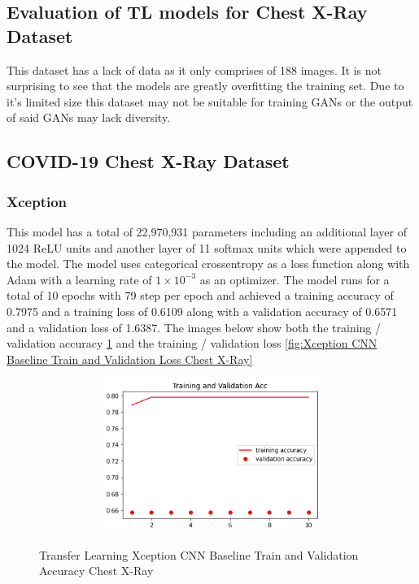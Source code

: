 \subsection{Evaluation of TL models for Chest X-Ray Dataset}
This dataset has a lack of data as it only comprises of 188 images.  It is not surprising to see that the models are greatly overfitting the training set.  Due to it's limited size this dataset may not be suitable for training GANs or the output of said GANs may lack diversity.
\subsection{COVID-19 Chest X-Ray Dataset}
\subsubsection{Xception}
This model has a total of 22,970,931 parameters including an additional layer of 1024 ReLU units and another layer of 11 softmax units which were appended to the model.  The model uses categorical crossentropy as a loss function along with Adam with a learning rate of $1 \times 10^{-3}$ as an optimizer.  The model runs for a total of 10 epochs with 79 step per epoch and achieved a training accuracy of 0.7975 and a training loss of 0.6109 along with a validation accuracy of 0.6571 and a validation loss of 1.6387. The images below show both the training / validation accuracy \ref{fig:Xception CNN Baseline Train and Validation Accuracy Chest X-Ray} and the training / validation loss \ref{fig:Xception CNN Baseline Train and Validation Loss Chest X-Ray}
 \begin{figure}[H]
    \centering
    \includegraphics[width=1\textwidth,height=5cm,keepaspectratio]{Images/XceptionBaselineTrainingValidationAccuracyChestX-Ray.png}\\
    \caption{Transfer Learning Xception CNN Baseline Train and Validation Accuracy Chest X-Ray}
    \label{fig:Xception CNN Baseline Train and Validation Accuracy Chest X-Ray}
\end{figure}
